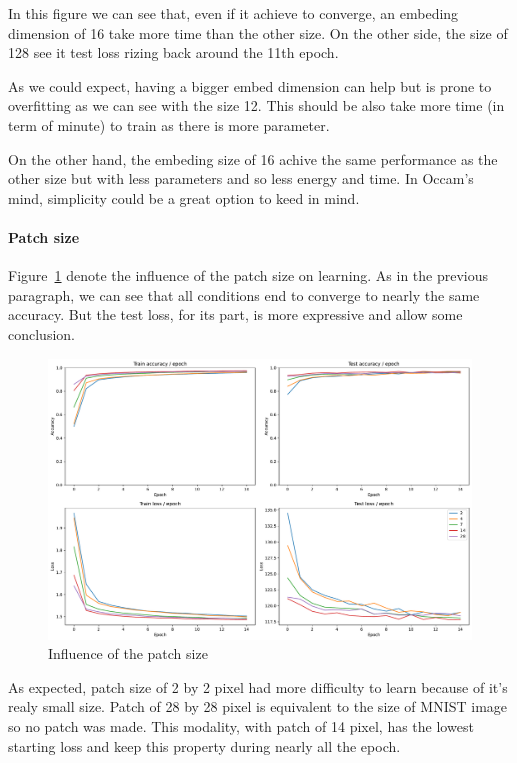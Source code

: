In this figure we can see that, even if it achieve to converge, an embeding dimension of 16 take more time than the other size. On the other side, the size of 128 see it test loss rizing back around the 11th epoch.

As we could expect, having a bigger embed dimension can help but is prone to overfitting as we can see with the size 12. This should be also take more time (in term of minute) to train as there is more parameter. 

On the other hand, the embeding size of 16 achive the same performance as the other size but with less parameters and so less energy and time. In Occam's mind, simplicity could be a great option to keed in mind.

\paragraph{Patch size}
Figure~\ref*{fig:patch_size_influence} denote the influence of the patch size on learning. As in the previous paragraph, we can see that all conditions end to converge to nearly the same accuracy. But the test loss, for its part, is more expressive and allow some conclusion.

\begin{figure}[H]
    \centering
    \includegraphics*[width=\textwidth]{figs/Transformers/patch_size_influence.pdf}
    \caption{Influence of the patch size}
    \label{fig:patch_size_influence}
\end{figure}

As expected, patch size of 2 by 2 pixel had more difficulty to learn because of it's realy small size. Patch of 28 by 28 pixel is equivalent to the size of MNIST image so no patch was made. This modality, with patch of 14 pixel, has the lowest starting loss and keep this property during nearly all the epoch. 

